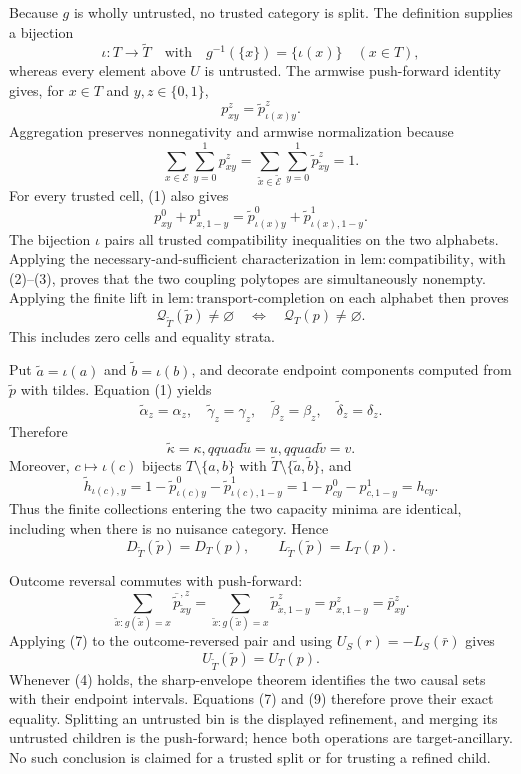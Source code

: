 Because \(g\) is wholly untrusted, no trusted category is split.  The
definition supplies a bijection
\[
 \iota:T\longrightarrow\widetilde T
 \quad\text{with}\quad
 g^{-1}(\{x\})=\{\iota(x)\}\quad(x\in T),
\]
whereas every element above \(U\) is untrusted.  The armwise push-forward
identity gives, for \(x\in T\) and \(y,z\in\{0,1\}\),
\[
 p^z_{xy}=\widetilde p^z_{\iota(x)y}. \tag{1}
\]
Aggregation preserves nonnegativity and armwise normalization because
\[
 \sum_{x\in\mathcal E}\sum_{y=0}^1p^z_{xy}
 =\sum_{\widetilde x\in\widetilde{\mathcal E}}
   \sum_{y=0}^1\widetilde p^z_{\widetilde x y}=1. \tag{2}
\]
For every trusted cell, (1) also gives
\[
 p^0_{xy}+p^1_{x,1-y}
 =\widetilde p^0_{\iota(x)y}
  +\widetilde p^1_{\iota(x),1-y}. \tag{3}
\]
The bijection \(\iota\) pairs all trusted compatibility inequalities on the
two alphabets.  Applying the necessary-and-sufficient characterization in
\(\mathrm{lem{:}compatibility}\), with (2)--(3), proves that the two
coupling polytopes are simultaneously nonempty.  Applying the finite lift
in \(\mathrm{lem{:}transport\mbox{-}completion}\) on each alphabet then
proves
\[
 \mathcal Q_{\widetilde T}(\widetilde p)\ne\varnothing
 \quad\Longleftrightarrow\quad
 \mathcal Q_T(p)\ne\varnothing. \tag{4}
\]
This includes zero cells and equality strata.

Put \(\widetilde a=\iota(a)\) and \(\widetilde b=\iota(b)\), and decorate
endpoint components computed from \(\widetilde p\) with tildes.  Equation
(1) yields
\[
 \widetilde\alpha_z=\alpha_z,
 \quad \widetilde\gamma_z=\gamma_z,
 \quad \widetilde\beta_z=\beta_z,
 \quad \widetilde\delta_z=\delta_z.
\]
Therefore
\[
 \widetilde\kappa=\kappa,qquad
 \widetilde u=u,qquad
 \widetilde v=v. \tag{5}
\]
Moreover, \(c\mapsto\iota(c)\) bijects
\(T\setminus\{a,b\}\) with
\(\widetilde T\setminus\{\widetilde a,\widetilde b\}\), and
\[
 \widetilde h_{\iota(c),y}
 =1-\widetilde p^0_{\iota(c)y}
    -\widetilde p^1_{\iota(c),1-y}
 =1-p^0_{cy}-p^1_{c,1-y}=h_{cy}. \tag{6}
\]
Thus the finite collections entering the two capacity minima are identical,
including when there is no nuisance category.  Hence
\[
 D_{\widetilde T}(\widetilde p)=D_T(p),
 \qquad
 L_{\widetilde T}(\widetilde p)=L_T(p). \tag{7}
\]

Outcome reversal commutes with push-forward:
\[
 \sum_{\widetilde x:g(\widetilde x)=x}
 \overline{\widetilde p}^{,z}_{\widetilde x y}
 =\sum_{\widetilde x:g(\widetilde x)=x}
 \widetilde p^z_{\widetilde x,1-y}
 =p^z_{x,1-y}=\bar p^z_{xy}. \tag{8}
\]
Applying (7) to the outcome-reversed pair and using
\(U_S(r)=-L_S(\bar r)\) gives
\[
 U_{\widetilde T}(\widetilde p)=U_T(p). \tag{9}
\]
Whenever (4) holds, the sharp-envelope theorem identifies the two causal
sets with their endpoint intervals.  Equations (7) and (9) therefore prove
their exact equality.  Splitting an untrusted bin is the displayed
refinement, and merging its untrusted children is the push-forward; hence
both operations are target-ancillary.  No such conclusion is claimed for a
trusted split or for trusting a refined child.

